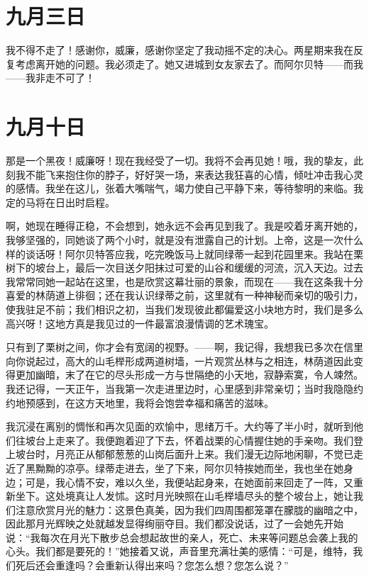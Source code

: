 \documentclass[12pt,oneside]{book}
\begin{document}
\chapter{九月三日}
我不得不走了！感谢你，威廉，感谢你坚定了我动摇不定的决心。两星期来我在反复考虑离开她的问题。我必须走了。她又进城到女友家去了。而阿尔贝特——而我——我非走不可了！


\chapter{九月十日}
那是一个黑夜！威廉呀！现在我经受了一切。我将不会再见她！哦，我的挚友，此刻我不能飞来抱住你的脖子，好好哭一场，来表达我狂喜的心情，倾吐冲击我心灵的感情。我坐在这儿，张着大嘴喘气，竭力使自己平静下来，等待黎明的来临。我定的马将在日出时启程。

啊，她现在睡得正稳，不会想到，她永远不会再见到我了。我是咬着牙离开她的，我够坚强的，同她谈了两个小时，就是没有泄露自己的计划。上帝，这是一次什么样的谈话呀！阿尔贝特答应我，吃完晚饭马上就同绿蒂一起到花园里来。我站在栗树下的坡台上，最后一次目送夕阳抹过可爱的山谷和缓缓的河流，沉入天边。过去我常常同她一起站在这里，也是欣赏这幕壮丽的景象，而现在——我在这条我十分喜爱的林荫道上徘徊；还在我认识绿蒂之前，这里就有一种神秘而亲切的吸引力，使我驻足不前；我们相识之初，当我们发现彼此都偏爱这小块地方时，我们是多么高兴呀！这地方真是我见过的一件最富浪漫情调的艺术瑰宝。

只有到了栗树之间，你才会有宽阔的视野。——啊，我记得，我想我已多次在信里向你说起过，高大的山毛榉形成两道树墙，一片观赏丛林与之相连，林荫道因此变得更加幽暗，末了在它的尽头形成一方与世隔绝的小天地，寂静索寞，令人竦然。我还记得，一天正午，当我第一次走进里边时，心里感到非常亲切；当时我隐隐约约地预感到，在这方天地里，我将会饱尝幸福和痛苦的滋味。

我沉浸在离别的惆怅和再次见面的欢愉中，思绪万千。大约等了半小时，就听到他们往坡台上走来了。我便跑着迎了下去，怀着战栗的心情握住她的手亲吻。我们登上坡台时，月亮正从郁郁葱葱的山岗后面升上来。我们漫无边际地闲聊，不觉已走近了黑黝黝的凉亭。绿蒂走进去，坐了下来，阿尔贝特挨她而坐，我也坐在她身边；可是，我心情不安，难以久坐，我便站起身来，在她面前来回走了一阵，又重新坐下。这处境真让人发怵。这时月光映照在山毛榉墙尽头的整个坡台上，她让我们注意欣赏月光的魅力：这景色真美，因为我们四周围都笼罩在朦胧的幽暗之中，因此那月光辉映之处就越发显得绚丽夺目。我们都没说话，过了一会她先开始说：“我每次在月光下散步总会想起故世的亲人，死亡、未来等问题总会袭上我的心头。我们都是要死的！”她接着又说，声音里充满壮美的感情：“可是，维特，我们死后还会重逢吗？会重新认得出来吗？您怎么想？您怎么说？”
\end{document}
